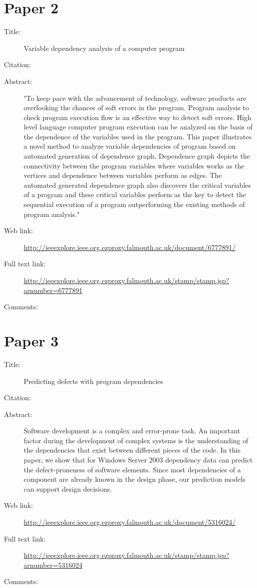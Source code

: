 \documentclass{scrartcl}
\begin{document}
\section*{Paper 2}
\begin{description}
\item[Title: ]Variable dependency analysis of a computer program
\item[Citation:] \cite{sadi2014variable}
\item[Abstract:] "To keep pace with the advancement of technology, software products are overlooking the chances of soft errors in the program. Program analysis to check program execution flow is an effective way to detect soft errors. High level language computer program execution can be analyzed on the basis of the dependence of the variables used in the program. This paper illustrates a novel method to analyze variable dependencies of program based on automated generation of dependence graph. Dependence graph depicts the connectivity between the program variables where variables works as the vertices and dependence between variables perform as edges. The automated generated dependence graph also discovers the critical variables of a program and these critical variables perform as the key to detect the sequential execution of a program outperforming the existing methods of program analysis."
\item[Web link:]\url{ http://ieeexplore.ieee.org.ezproxy.falmouth.ac.uk/document/6777891/}
\item[Full text link:]\url {http://ieeexplore.ieee.org.ezproxy.falmouth.ac.uk/stamp/stamp.jsp?arnumber=6777891}
\item[Comments:]
\end{description}

\section*{Paper 3}
\begin{description}
\item[Title:]Predicting defects with program dependencies
\item[Citation:] \cite{zimmermann2009predicting}
\item[Abstract:] Software development is a complex and error-prone task. An important factor during the development of complex systems is the understanding of the dependencies that exist between different pieces of the code. In this paper, we show that for Windows Server 2003 dependency data can predict the defect-proneness of software elements. Since most dependencies of a component are already known in the design phase, our prediction models can support design decisions.
\item[Web link:] \url{ http://ieeexplore.ieee.org.ezproxy.falmouth.ac.uk/document/5316024/}
\item[Full text link:]\url{ http://ieeexplore.ieee.org.ezproxy.falmouth.ac.uk/stamp/stamp.jsp?arnumber=5316024}
\item[Comments:] 
\end{description}
\end{document}
